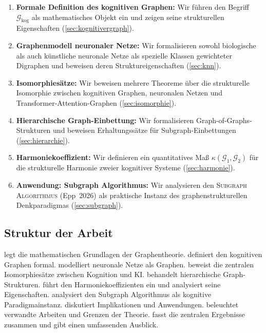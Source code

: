 ﻿\documentclass[12pt,a4paper]{article}
\theoremstyle{plain}
\theoremstyle{definition}
\theoremstyle{remark}
\newcommand{\GG}{\mathcal{G}}
\newcommand{\SA}{\textnormal{\textsc{Subgraph Algorithmus}}}
\begin{document}
\begin{enumerate}[label=\textbf{(B\arabic*)}]
  \item \textbf{Formale Definition des kognitiven Graphen:} Wir führen den Begriff $\GG_{\text{kog}}$ als mathematisches Objekt ein und zeigen seine strukturellen Eigenschaften (\cref{sec:kognitivergraph}).

  \item \textbf{Graphenmodell neuronaler Netze:} Wir formalisieren sowohl biologische als auch künstliche neuronale Netze als spezielle Klassen gewichteter Digraphen und beweisen deren Struktureigenschaften (\cref{sec:knn}).

  \item \textbf{Isomorphiesätze:} Wir beweisen mehrere Theoreme über die strukturelle Isomorphie zwischen kognitiven Graphen, neuronalen Netzen und Transformer-Attention-Graphen (\cref{sec:isomorphie}).

  \item \textbf{Hierarchische Graph-Einbettung:} Wir formalisieren Graph-of-Graphs-Struk\-turen und beweisen Erhaltungssätze für Subgraph-Einbettungen (\cref{sec:hierarchie}).

  \item \textbf{Harmoniekoeffizient:} Wir definieren ein quantitatives Maß $\kappa(\GG_1, \GG_2)$ für die strukturelle Harmonie zweier kognitiver Systeme (\cref{sec:harmonie}).

  \item \textbf{Anwendung: Subgraph Algorithmus:} Wir analysieren den \SA{} (Epp~2026) als praktische Instanz des graphenstrukturellen Denkparadigmas (\cref{sec:subgraph}).
\end{enumerate}

\subsection{Struktur der Arbeit}

 legt die mathematischen Grundlagen der Graphentheorie.  definiert den kognitiven Graphen formal.  modelliert neuronale Netze als Graphen.  beweist die zentralen Isomorphiesätze zwischen Kognition und KI.  behandelt hierarchische Graph-Strukturen.  führt den Harmoniekoeffizienten ein und analysiert seine Eigenschaften.  analysiert den Subgraph Algorithmus als kognitive Paradigmainstanz.  diskutiert Implikationen und Anwendungen.  beleuchtet verwandte Arbeiten und Grenzen der Theorie.  fasst die zentralen Ergebnisse zusammen und gibt einen umfassenden Ausblick.
\end{document}
